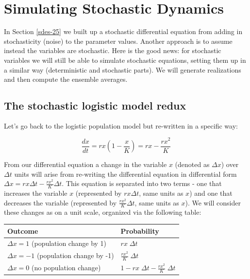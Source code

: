 \documentclass[
]{book}
\theoremstyle{definition}
\theoremstyle{definition}
\theoremstyle{definition}
\theoremstyle{remark}
\begin{document}
\hypertarget{simul-stoch-26}{%
\chapter{Simulating Stochastic Dynamics}\label{simul-stoch-26}}

In Section \ref{sdes-25} we built up a stochastic differential equation from adding in stochasticity (noise) to the parameter values. Another approach is to assume instead the variables are stochastic. Here is the good news: for stochastic variables we will still be able to simulate stochastic equations, setting them up in a similar way (deterministic and stochastic parts). We will generate realizations and then compute the ensemble averages.

\hypertarget{the-stochastic-logistic-model-redux}{%
\section{The stochastic logistic model redux}\label{the-stochastic-logistic-model-redux}}

Let's go back to the logistic population model but re-written in a specific way:

\begin{equation}
\frac{dx}{dt} = r x \left( 1 - \frac{x}{K} \right) = r x - \frac{rx^{2}}{K}
\end{equation}

From our differential equation a change in the variable \(x\) (denoted as \(\Delta x\)) over \(\Delta t\) units will arise from re-writing the differential equation in differential form \(\displaystyle \Delta x = r x \Delta t - \frac{rx^{2}}{K} \Delta t\). This equation is separated into two terms - one that increases the variable \(x\) (represented by \(r x \Delta t\), same units as \(x\)) and one that decreases the variable (represented by \(\displaystyle \frac{rx^{2}}{K} \Delta t\), same units as \(x\)). We will consider these changes as on a unit scale, organized via the following table:

\begin{longtable}[]{@{}
  >{\raggedright\arraybackslash}p{}
  >{\raggedright\arraybackslash}p{}@{}}
\toprule
Outcome & Probability \\
\midrule
\endhead
\(\Delta x = 1\) (population change by 1) & \(r x \; \Delta t\) \\
\(\Delta x = -1\) (population change by -1) & \(\displaystyle \frac{rx^{2}}{K} \; \Delta t\) \\
\(\Delta x = 0\) (no population change) & \(\displaystyle 1 - rx \; \Delta t - \frac{rx^{2}}{K} \; \Delta t\) \\
\bottomrule
\end{longtable}
\end{document}

